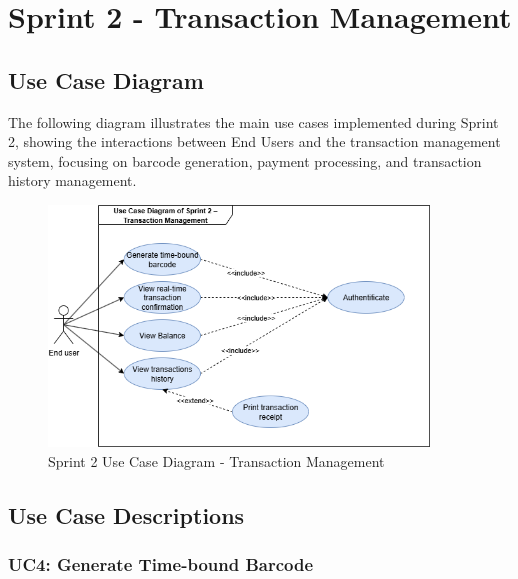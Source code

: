 \section{Sprint 2 - Transaction Management}

\subsection{Use Case Diagram}

The following diagram illustrates the main use cases implemented during Sprint 2, showing the interactions between End Users and the transaction management system, focusing on barcode generation, payment processing, and transaction history management.

\begin{figure}[H]
\centering
\includegraphics[width=0.9\textwidth]{images/usecase_sprint2.png}
\caption{Sprint 2 Use Case Diagram - Transaction Management}
\label{fig:sprint2_usecase_diagram}
\end{figure}

\subsection{Use Case Descriptions}

\subsubsection{UC4: Generate Time-bound Barcode}

